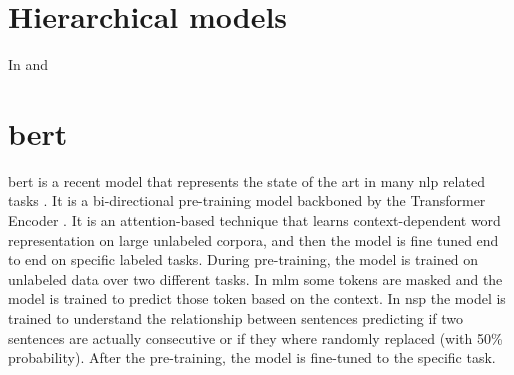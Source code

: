\section{Hierarchical models}
In \cite{yang_hierarchical_2016} and \cite{wang2019multi}

\section{\acs{bert}}
\ac{bert} \cite{devlin2018bert} is a recent model that represents the
state of the art in many \ac{nlp} related tasks
\cite{chatterjee2019semeval,hu2019introductory,lee2019biobert,tshitoyan2019unsupervised}.
It is a
bi-directional pre-training model backboned by the Transformer Encoder
\cite{vaswani2017attention}. It is an attention-based technique that
learns context-dependent word representation on large unlabeled
corpora, and then the model is fine tuned end to end on specific labeled
tasks. During pre-training, the model is trained
on unlabeled data over two different tasks. In \ac{mlm} some tokens
are masked and the model is trained to predict those token based on
the context. In \ac{nsp} the model is trained to understand the
relationship between sentences predicting if two sentences are actually
consecutive or if they where randomly replaced (with 50\%
probability). After the pre-training, the model is fine-tuned to the
specific task.



